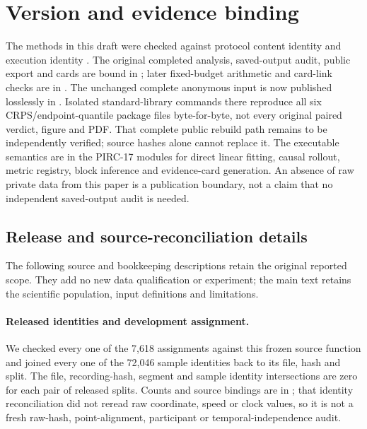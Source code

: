 \documentclass[11pt]{article}
\begin{document}
\appendix
\section{Version and evidence binding}
The methods in this draft were checked against protocol content identity
and execution identity
.
The original completed analysis, saved-output audit, public export and cards
are bound in ; later fixed-budget arithmetic
and card-link checks are in .
The unchanged complete anonymous input is now published losslessly in
. Isolated standard-library commands there
reproduce all six CRPS/endpoint-quantile package files byte-for-byte, not every
original paired verdict, figure and PDF. That complete public rebuild path
remains to be independently verified; source hashes alone cannot replace it.
The executable semantics are in the PIRC-17 modules for direct linear fitting,
causal rollout, metric registry, block inference and evidence-card generation.
An absence of raw private data from this paper is a publication boundary, not
a claim that no independent saved-output audit is needed.

\subsection{Release and source-reconciliation details}
\label{sec:source-reconciliation-details}
The following source and bookkeeping descriptions retain the original
reported scope. They add no new data qualification or experiment; the
main text retains the scientific population, input definitions and limitations.

\paragraph{Released identities and development assignment.}
We checked every one of the 7,618 assignments against this frozen source
function and joined every one of the 72,046 sample identities back to its
file, hash and split. The file, recording-hash, segment and sample identity
intersections are zero for each pair of released splits. Counts and source
bindings are in ; that identity
reconciliation did not reread raw coordinate, speed or clock values, so it is not a fresh raw-hash,
point-alignment, participant or temporal-independence audit.
\end{document}
